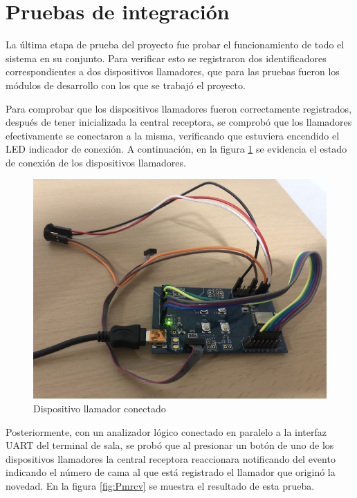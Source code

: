\section{Pruebas de integración}
\label{sec:pruebasInt}

La última etapa de prueba del proyecto fue probar el funcionamiento de todo el sistema en su conjunto. Para verificar esto se registraron dos identificadores correspondientes a dos dispositivos llamadores, que para las pruebas fueron los módulos de desarrollo con los que se trabajó el proyecto.

Para comprobar que los dispositivos llamadores fueron correctamente registrados, después de tener inicializada la central receptora, se comprobó que los llamadores efectivamente se conectaron a la misma, verificando que estuviera encendido el LED indicador de conexión. A continuación, en la figura \ref{fig:Pmcon} se evidencia el estado de conexión de los dispositivos llamadores.

\begin{figure}[htpb]
	\centering
	\includegraphics[scale=0.45]{./Figures/callcon.jpeg}	
	\caption{Dispositivo llamador conectado}
	\label{fig:Pmcon}
\end{figure}

Posteriormente, con un analizador lógico conectado en paralelo a la interfaz UART del terminal de sala, se probó que al presionar un botón de uno de los dispositivos llamadores la central receptora reaccionara notificando del evento indicando el número de cama al que está registrado el llamador que originó la novedad. En la figura \ref{fig:Pmrcv} se muestra el resultado de esta prueba.

